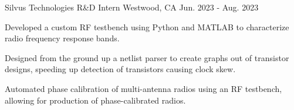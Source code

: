   \begin{cventry}
    {Silvus Technologies} %
    {R\&D Intern} %
    {Westwood, CA} %
    {Jun. 2023 - Aug. 2023} %
    {
      \begin{cvitems} %
        \item {
        Developed a custom RF testbench using Python and MATLAB to characterize radio frequency response bands.
        }
        \item {
        Designed from the ground up a netlist parser to create graphs out of transistor designs, speeding up detection of transistors causing clock skew.
        }
        \item {
        Automated phase calibration of multi-antenna radios using an RF testbench, allowing for production of phase-calibrated radios.
        }
      \end{cvitems}
    }
  \end{cventry}
